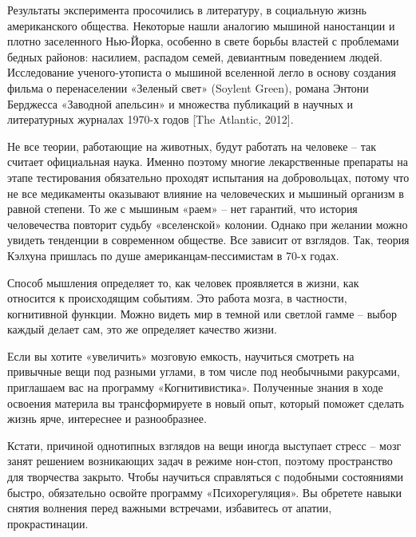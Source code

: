 Результаты эксперимента просочились в литературу, в социальную жизнь американского общества. Некоторые нашли аналогию мышиной наностанции и плотно заселенного Нью-Йорка, особенно в свете борьбы властей с проблемами бедных районов: насилием, распадом семей, девиантным поведением людей. Исследование ученого-утописта о мышиной вселенной легло в основу создания фильма о перенаселении «Зеленый свет» (Soylent Green), романа Энтони Берджесса «Заводной апельсин» и множества публикаций в научных и литературных журналах 1970-х годов [The Atlantic, 2012].

Не все теории, работающие на животных, будут работать на человеке – так считает официальная наука. Именно поэтому многие лекарственные препараты на этапе тестирования обязательно проходят испытания на добровольцах, потому что не все медикаменты оказывают влияние на человеческих и мышиный организм в равной степени. То же с мышиным «раем» – нет гарантий, что история человечества повторит судьбу «вселенской» колонии. Однако при желании можно увидеть тенденции в современном обществе. Все зависит от взглядов. Так, теория Кэлхуна пришлась по душе американцам-пессимистам в 70-х годах.

Способ мышления определяет то, как человек проявляется в жизни, как относится к происходящим событиям. Это работа мозга, в частности, когнитивной функции. Можно видеть мир в темной или светлой гамме – выбор каждый делает сам, это же определяет качество жизни.

Если вы хотите «увеличить» мозговую емкость, научиться смотреть на привычные вещи под разными углами, в том числе под необычными ракурсами, приглашаем вас на программу «Когнитивистика». Полученные знания в ходе освоения материла вы трансформируете в новый опыт, который поможет сделать жизнь ярче, интереснее и разнообразнее.

Кстати, причиной однотипных взглядов на вещи иногда выступает стресс – мозг занят решением возникающих задач в режиме нон-стоп, поэтому пространство для творчества закрыто. Чтобы научиться справляться с подобными состояниями быстро, обязательно освойте программу «Психорегуляция». Вы обретете навыки снятия волнения перед важными встречами, избавитесь от апатии, прокрастинации.

